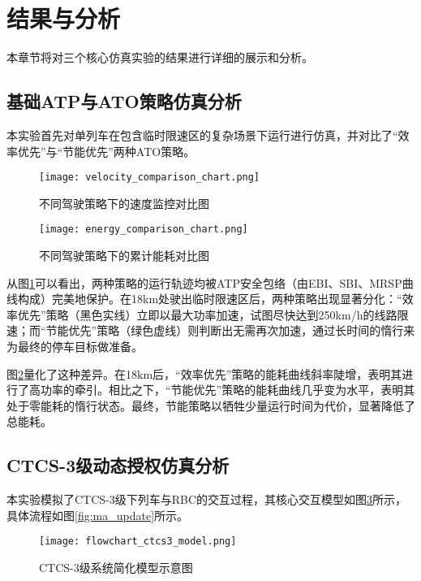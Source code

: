 \documentclass[11pt, a4paper]{ctexart}
\begin{document}
\section{结果与分析}
本章节将对三个核心仿真实验的结果进行详细的展示和分析。

\subsection{基础ATP与ATO策略仿真分析}
本实验首先对单列车在包含临时限速区的复杂场景下运行进行仿真，并对比了“效率优先”与“节能优先”两种ATO策略。

\begin{figure}[h!]
    \centering
    \texttt{[image: velocity\_comparison\_chart.png]}
    \caption{不同驾驶策略下的速度监控对比图}
    \label{fig:velocity_comparison}
\end{figure}

\begin{figure}[h!]
    \centering
    \texttt{[image: energy\_comparison\_chart.png]}
    \caption{不同驾驶策略下的累计能耗对比图}
    \label{fig:energy_comparison}
\end{figure}

从图\ref{fig:velocity_comparison}可以看出，两种策略的运行轨迹均被ATP安全包络（由EBI、SBI、MRSP曲线构成）完美地保护。在18km处驶出临时限速区后，两种策略出现显著分化：“效率优先”策略（黑色实线）立即以最大功率加速，试图尽快达到250km/h的线路限速；而“节能优先”策略（绿色虚线）则判断出无需再次加速，通过长时间的惰行来为最终的停车目标做准备。

图\ref{fig:energy_comparison}量化了这种差异。在18km后，“效率优先”策略的能耗曲线斜率陡增，表明其进行了高功率的牵引。相比之下，“节能优先”策略的能耗曲线几乎变为水平，表明其处于零能耗的惰行状态。最终，节能策略以牺牲少量运行时间为代价，显著降低了总能耗。

\subsection{CTCS-3级动态授权仿真分析}
本实验模拟了CTCS-3级下列车与RBC的交互过程，其核心交互模型如图\ref{fig:ctcs3_model}所示，具体流程如图\ref{fig:ma_update}所示。

\begin{figure}[h!]
    \centering
    \texttt{[image: flowchart\_ctcs3\_model.png]}
    \caption{CTCS-3级系统简化模型示意图}
    \label{fig:ctcs3_model}
\end{figure}
\end{document}
